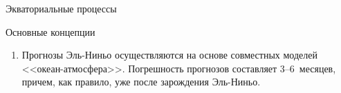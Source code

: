 \begin{chapter}{Экваториальные процессы}
\begin{section}{Основные концепции}
\begin{enumerate}
\item
Прогнозы Эль-Ниньо осуществляются на основе совместных моделей
<<океан-атмосфера>>. Погрешность прогнозов%
 составляет 3--6~месяцев, 
причем, как правило, уже после зарождения Эль-Ниньо.
%
\end{enumerate}
\end{section}

\end{chapter}